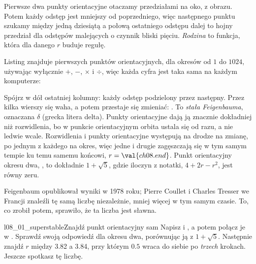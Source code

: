 
\noindent
Pierwsze dwa punkty orientacyjne otaczamy przedziałami na oko, z obrazu.
Potem każdy odstęp jest mniejszy od poprzedniego, więc następnego punktu
szukamy między jedną dziesiątą a połową ostatniego odstępu dalej \dash{} to
hojny przedział dla odstępów malejących o czynnik bliski pięciu.
\emph{Rodzina} to funkcja, która dla danego $r$ buduje regułę.


\noindent
Listing znajduje pierwszych  punktów
orientacyjnych, dla okresów od $1$ do $1024$, używając wyłącznie $+$, $-$,
$\times$ i $\div$, więc każda cyfra jest taka sama na każdym komputerze:


\noindent
Spójrz w dół ostatniej kolumny: każdy odstęp podzielony przez następny.
Przez kilka wierszy się waha, a potem przestaje się zmieniać:
. To \emph{stała Feigenbauma}, oznaczana $\delta$ (grecka
litera delta). Punkty orientacyjne dają ją znacznie dokładniej niż
rozwidlenia, bo w punkcie orientacyjnym orbita ustala się od razu, a nie
ledwie wcale. Rozwidlenia i punkty orientacyjne występują na drodze na
zmianę, po jednym z każdego na okres, więc jedne i drugie zagęszczają się w
tym samym tempie ku temu samemu końcowi, $r = \val{ch08.end}$. Punkt
orientacyjny okresu dwa, , to dokładnie $1 + \sqrt{5}$,
gdzie iloczyn z notatki, $4 + 2r - r^{2}$, jest równy zeru.

Feigenbaum opublikował wyniki w 1978 roku; Pierre Coullet i Charles Tresser
we Francji znaleźli tę samą liczbę niezależnie, mniej więcej w tym samym
czasie. To, co zrobił potem, sprawiło, że ta liczba jest sławna.

\begin{lab}{l08_01_superstable}{Znajdź punkt orientacyjny sam}
Napisz  i , a potem połącz je w
. Sprawdź swoją odpowiedź dla okresu dwa, porównując ją z
$1 + \sqrt{5}$. Następnie znajdź $r$ między \num{3.82} a \num{3.84}, przy
którym $\num{0.5}$ wraca do siebie po \emph{trzech} krokach. Jeszcze
spotkasz tę liczbę.
\end{lab}


